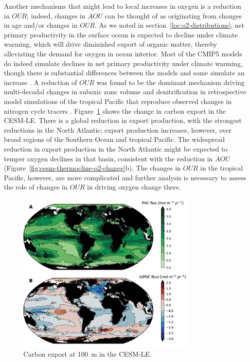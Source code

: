 \documentclass{report_chapter}
\begin{document}
Another mechanisms that might lead to local increases in oxygen is a reduction in $OUR$; indeed, changes in $AOU$ can be thought of as originating from changes in age and/or changes in $OUR$.
As we noted in section~\ref{loc:o2-distributions}, net primary productivity in the surface ocean is expected to decline under climate warming, which will drive diminished export of organic matter, thereby alleviating the demand for oxygen in ocean interior.
Most of the CMIP5 models do indeed simulate declines in net primary productivity under climate warming, though there is substantial differences between the models and some simulate an increase \citep{Laufkotter-Vogt-etal-2015}.
A reduction of $OUR$ was found to be the dominant mechanism driving multi-decadal changes in suboxic zone volume and denitrification in retrospective model simulations of the tropical Pacific that reproduce observed changes in nitrogen cycle tracers \citep{Deutsch-Brix-etal-2011,Deutsch-Berelson-etal-2014}.
Figure~\ref{fig:cesm-carbon-export} shows the change in carbon export in the CESM-LE.
There is a global reduction in export production, with the strongest reductions in the North Atlantic; export production increases, however, over broad regions of the Southern Ocean and tropical Pacific.
The widespread reduction in export production in the North Atlantic might be expected to temper oxygen declines in that basin, consistent with the reduction in $AOU$ (Figure~\ref{fig:cesm-thermocline-o2-change}b).
The changes in $OUR$ in the tropical Pacific, however, are more complicated and further analysis is necessary to assess the role of changes in $OUR$ in driving oxygen change there.

\begin{figure}[tbp]
\centering
\includegraphics[width=0.8\textwidth]{cesm-export-production.png}
\caption{Carbon export at 100~m in the CESM-LE.}
\label{fig:cesm-carbon-export}
\end{figure}
\end{document}
